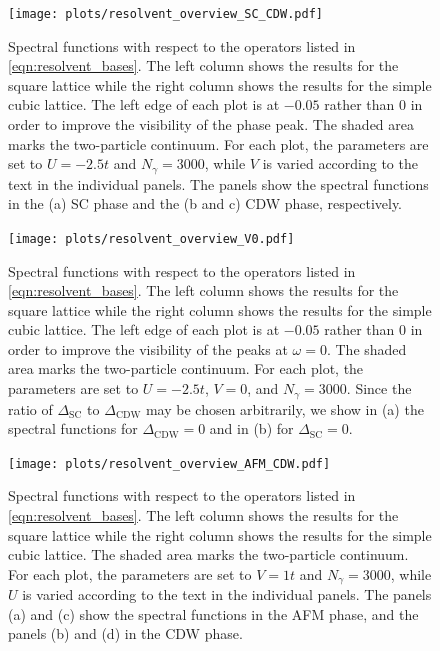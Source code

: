 \documentclass[
    reprint, 
    aps,
    preprintnumbers,
    twocolumn,
    prb,
    superscriptaddress
]{revtex4-2}
\begin{document}

\begin{figure}
    \centering
    \texttt{[image: plots/resolvent\_overview\_SC\_CDW.pdf]}
    \caption{Spectral functions with respect to the operators listed in \eqref{eqn:resolvent_bases}.
    The left column shows the results for the square lattice while the right column shows the results for the simple cubic lattice.
    The left edge of each plot is at $-0.05$ rather than $0$ in order to improve the visibility of the phase peak.
    The shaded area marks the two-particle continuum.
    For each plot, the parameters are set to $U=-2.5t$ and $N_\gamma = 3000$, while $V$ is varied according to the text in the individual panels.
    The panels show the spectral functions in the (a) SC phase and the (b and c) CDW phase, respectively.}
    \label{fig:resolvent_overview_SC}
\end{figure}

\begin{figure}
    \centering
    \texttt{[image: plots/resolvent\_overview\_V0.pdf]}
    \caption{Spectral functions with respect to the operators listed in \eqref{eqn:resolvent_bases}.
    The left column shows the results for the square lattice while the right column shows the results for the simple cubic lattice.
    The left edge of each plot is at $-0.05$ rather than $0$ in order to improve the visibility of the peaks at $\omega=0$.
    The shaded area marks the two-particle continuum.
    For each plot, the parameters are set to $U=-2.5t$, $V=0$, and $N_\gamma = 3000$.
    Since the ratio of $\Delta_\text{SC}$ to $\Delta_\text{CDW}$ may be chosen arbitrarily, we show in (a) the spectral functions for $\Delta_\text{CDW} = 0$ and in (b) for $\Delta_\text{SC} = 0$.}
    \label{fig:resolvent_overview_V0}
\end{figure}

\begin{figure}
    \centering
    \texttt{[image: plots/resolvent\_overview\_AFM\_CDW.pdf]}
    \caption{Spectral functions with respect to the operators listed in \eqref{eqn:resolvent_bases}.
    The left column shows the results for the square lattice while the right column shows the results for the simple cubic lattice.
    The shaded area marks the two-particle continuum.
    For each plot, the parameters are set to $V=1t$ and $N_\gamma = 3000$, while $U$ is varied according to the text in the individual panels.
    The panels (a) and (c) show the spectral functions in the AFM phase, and the panels (b) and (d) in the CDW phase.}
    \label{fig:resolvent_overview_AFM}
\end{figure}
\end{document}
